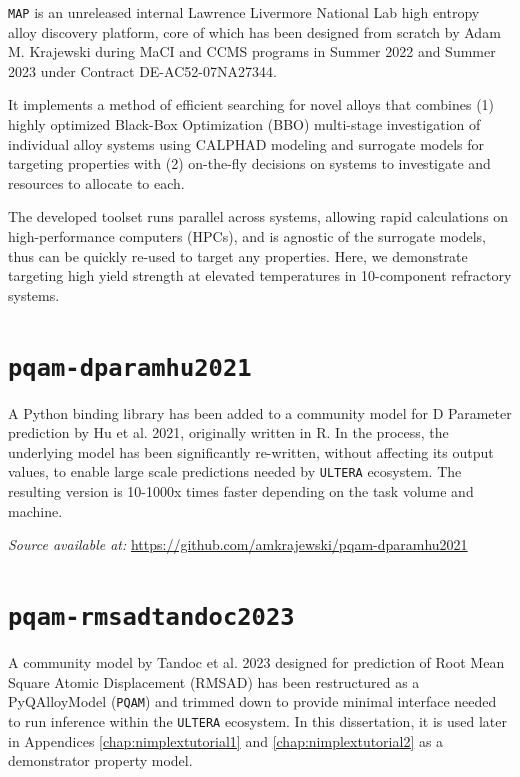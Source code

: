 \texttt{MAP} is an unreleased internal Lawrence Livermore National Lab high entropy alloy discovery platform, core of which has been designed from scratch by Adam M. Krajewski during MaCI and CCMS programs in Summer 2022 and Summer 2023 under Contract DE-AC52-07NA27344.

It implements a method of efficient searching for novel alloys that combines (1) highly optimized Black-Box Optimization (BBO) multi-stage investigation of individual alloy systems using CALPHAD modeling and surrogate models for targeting properties with (2) on-the-fly decisions on systems to investigate and resources to allocate to each. 

The developed toolset runs parallel across systems, allowing rapid calculations on high-performance computers (HPCs), and is agnostic of the surrogate models, thus can be quickly re-used to target any properties. Here, we demonstrate targeting high yield strength at elevated temperatures in 10-component refractory systems.


\section{\texttt{pqam-dparamhu2021}} \label{osoft:sec:dparam}

A Python binding library has been added to a community model for D Parameter prediction by Hu et al. 2021, originally written in R. In the process, the underlying model has been significantly re-written, without affecting its output values, to enable large scale predictions needed by \texttt{ULTERA} ecosystem. The resulting version is 10-1000x times faster depending on the task volume and machine.

\hspace{24pt} 
\textit{Source available at:} 
\href{https://github.com/amkrajewski/pqam-dparamhu2021}{https://github.com/amkrajewski/pqam-dparamhu2021}



\section{\texttt{pqam-rmsadtandoc2023}} \label{osoft:sec:rmsad}

A community model by Tandoc et al. 2023 designed for prediction of Root Mean Square Atomic Displacement (RMSAD) has been restructured as a PyQAlloyModel (\texttt{PQAM}) and trimmed down to provide minimal interface needed to run inference within the \texttt{ULTERA} ecosystem. In this dissertation, it is used later in Appendices \ref{chap:nimplextutorial1} and \ref{chap:nimplextutorial2} as a demonstrator property model.

